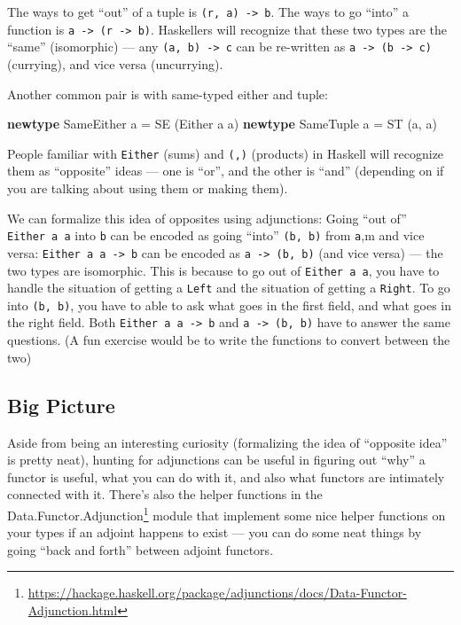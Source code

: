 \documentclass[]{article}
\newenvironment{Shaded}{}{}
\newcommand{\DataTypeTok}[1]{\textcolor[rgb]{0.56,0.13,0.00}{#1}}
\newcommand{\KeywordTok}[1]{\textcolor[rgb]{0.00,0.44,0.13}{\textbf{#1}}}
\newcommand{\NormalTok}[1]{#1}
\newcommand{\OtherTok}[1]{\textcolor[rgb]{0.00,0.44,0.13}{#1}}
\renewcommand{\href}[2]{#2\footnote{\url{#1}}}
\begin{document}
The ways to get ``out'' of a tuple is \texttt{(r,\ a)\ -\textgreater{}\ b}. The
ways to go ``into'' a function is
\texttt{a\ -\textgreater{}\ (r\ -\textgreater{}\ b)}. Haskellers will recognize
that these two types are the ``same'' (isomorphic) --- any
\texttt{(a,\ b)\ -\textgreater{}\ c} can be re-written as
\texttt{a\ -\textgreater{}\ (b\ -\textgreater{}\ c)} (currying), and vice versa
(uncurrying).

Another common pair is with same-typed either and tuple:

\begin{Shaded}
\begin{Highlighting}[]
\KeywordTok{newtype} \DataTypeTok{SameEither}\NormalTok{ a }\OtherTok{=} \DataTypeTok{SE}\NormalTok{ (}\DataTypeTok{Either}\NormalTok{ a a)}
\KeywordTok{newtype} \DataTypeTok{SameTuple}\NormalTok{  a }\OtherTok{=} \DataTypeTok{ST}\NormalTok{ (a, a)}
\end{Highlighting}
\end{Shaded}

People familiar with \texttt{Either} (sums) and \texttt{(,)} (products) in
Haskell will recognize them as ``opposite'' ideas --- one is ``or'', and the
other is ``and'' (depending on if you are talking about using them or making
them).

We can formalize this idea of opposites using adjunctions: Going ``out of''
\texttt{Either\ a\ a} into \texttt{b} can be encoded as going ``into''
\texttt{(b,\ b)} from \texttt{a},m and vice versa:
\texttt{Either\ a\ a\ -\textgreater{}\ b} can be encoded as
\texttt{a\ -\textgreater{}\ (b,\ b)} (and vice versa) --- the two types are
isomorphic. This is because to go out of \texttt{Either\ a\ a}, you have to
handle the situation of getting a \texttt{Left} and the situation of getting a
\texttt{Right}. To go into \texttt{(b,\ b)}, you have to able to ask what goes
in the first field, and what goes in the right field. Both
\texttt{Either\ a\ a\ -\textgreater{}\ b} and
\texttt{a\ -\textgreater{}\ (b,\ b)} have to answer the same questions. (A fun
exercise would be to write the functions to convert between the two)

\hypertarget{big-picture}{%
\subsection{Big Picture}\label{big-picture}}

Aside from being an interesting curiosity (formalizing the idea of ``opposite
idea'' is pretty neat), hunting for adjunctions can be useful in figuring out
``why'' a functor is useful, what you can do with it, and also what functors are
intimately connected with it. There's also the helper functions in the
\href{https://hackage.haskell.org/package/adjunctions/docs/Data-Functor-Adjunction.html}{Data.Functor.Adjunction}
module that implement some nice helper functions on your types if an adjoint
happens to exist --- you can do some neat things by going ``back and forth''
between adjoint functors.
\end{document}
